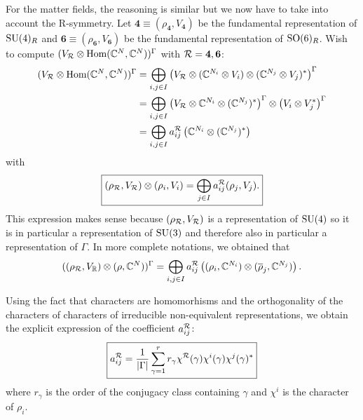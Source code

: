            For the matter fields, the reasoning is similar but we now have to take into account the R-symmetry. Let $\boldsymbol{4}\equiv(\rho_{\boldsymbol{4}},V_{\boldsymbol{4}})$ be the fundamental representation of $\text{SU}(4)_R$ and $\boldsymbol{6}\equiv(\rho_{\boldsymbol{6}},V_{\boldsymbol{6}})$ be the fundamental representation of $\text{SO}(6)_R$. Wish to compute $(V_{\mathcal{R}}\otimes\text{Hom}(\mathbb{C}^N,\mathbb{C}^N))^\Gamma$ with $\mathcal{R}=\boldsymbol{4},\boldsymbol{6}$:
            \begin{align}
                (V_{\mathcal{R}}\otimes\text{Hom}(\mathbb{C}^N,\mathbb{C}^N))^\Gamma &= \bigoplus_{i,j\in I} \left(V_{\mathcal{R}}\otimes (\mathbb{C}^{N_i}\otimes V_i)\otimes(\mathbb{C}^{N_j}\otimes V_j)^*\right)^\Gamma\\
                &= \bigoplus_{i,j\in I} \left(V_{\mathcal{R}}\otimes\mathbb{C}^{N_i}\otimes(\mathbb{C}^{N_j})^*\right)^\Gamma\otimes\left(V_i\otimes V^*_j\right)^\Gamma\\
                &= \bigoplus_{i,j\in I}a^{\mathcal{R}}_{ij}\left(\mathbb{C}^{N_i}\otimes(\mathbb{C}^{N_j})^*\right)
            \end{align}
            with
            \begin{equation}
                \boxed{(\rho_{\mathcal{R}},V_{\mathcal{R}})\otimes(\rho_i,V_i)=\bigoplus_{j\in I}a^{\mathcal{R}}_{ij}(\rho_j,V_j).}\label{eq:defaij}
            \end{equation}
            This expression makes sense because $(\rho_{\mathcal{R}},V_{\mathcal{R}})$ is a representation of $\text{SU}(4)$ so it is in particular a representation of $\text{SU}(3)$ and therefore also in particular a representation of $\Gamma$. In more complete notations, we obtained that
            \begin{equation}
                ((\rho_{\mathcal{R}},V_{\mathbb{R}})\otimes(\rho,\mathbb{C}^N))^\Gamma = \bigoplus_{i,j\in I}a^{\mathcal{R}}_{ij}\left((\rho_i,\mathbb{C}^{N_i})\otimes(\overline{\rho}_j,\mathbb{C}^{N_j})\right).\label{eq:resdecomp}
            \end{equation}
            

            Using the fact that characters are homomorhisms and the orthogonality of the characters of characters of irreducible non-equivalent representations, we obtain the explicit expression of the coefficient $a^{\mathcal{R}}_{ij}$:
            \begin{equation}
                \boxed{a^{\mathcal{R}}_{ij} = \frac{1}{\abs{\Gamma}}\sum^r_{\gamma=1} r_\gamma\chi^{\mathcal{R}}(\gamma)\chi^i(\gamma)\chi^j(\gamma)^*}\label{eq:aij}
            \end{equation}
            where $r_\gamma$ is the order of the conjugacy class containing $\gamma$ and $\chi^i$ is the character of $\rho_i$.

